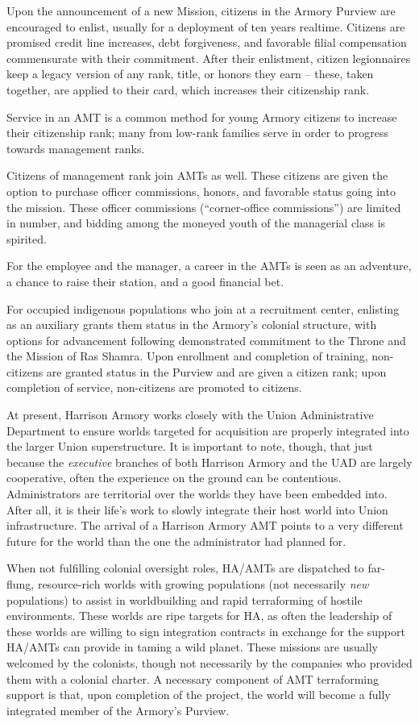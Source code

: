 Upon the announcement of a new Mission, citizens in the Armory Purview are encouraged to
enlist, usually for a deployment of ten years realtime. Citizens are promised credit line increases,
debt forgiveness, and favorable filial compensation commensurate with their commitment. After
their enlistment, citizen legionnaires keep a legacy version of any rank, title, or honors they earn
-- these, taken together, are applied to their card, which increases their citizenship rank.

Service in an AMT is a common method for young Armory citizens to increase their citizenship
rank; many from low-rank families serve in order to progress towards management ranks.

Citizens of management rank join AMTs as well. These citizens are given the option to purchase
officer commissions, honors, and favorable status going into the mission. These officer
commissions (“corner-office commissions”) are limited in number, and bidding among the
moneyed youth of the managerial class is spirited.

For the employee and the manager, a career in the AMTs is seen as an adventure, a chance to
raise their station, and a good financial bet.

For occupied indigenous populations who join at a recruitment center, enlisting as an auxiliary
grants them status in the Armory’s colonial structure, with options for advancement following
demonstrated commitment to the Throne and the Mission of Ras Shamra. Upon enrollment and
completion of training, non-citizens are granted status in the Purview and are given a citizen
rank; upon completion of service, non-citizens are promoted to citizens.

At present, Harrison Armory works closely with the Union Administrative Department to ensure
worlds targeted for acquisition are properly integrated into the larger Union superstructure. It is
important to note, though, that just because the \textit{executive} branches of both Harrison Armory and
the UAD are largely cooperative, often the experience on the ground can be contentious.
Administrators are territorial over the worlds they have been embedded into. After all, it is their
life’s work to slowly integrate their host world into Union infrastructure. The arrival of a Harrison
Armory AMT points to a very different future for the world than the one the administrator had
planned for.

When not fulfilling colonial oversight roles, HA/AMTs are dispatched to far-flung, resource-rich
worlds with growing populations (not necessarily \textit{new} populations) to assist in worldbuilding and
rapid terraforming of hostile environments. These worlds are ripe targets for HA, as often the
leadership of these worlds are willing to sign integration contracts in exchange for the support
HA/AMTs can provide in taming a wild planet. These missions are usually welcomed by the
colonists, though not necessarily by the companies who provided them with a colonial charter. A
necessary component of AMT terraforming support is that, upon completion of the project, the
world will become a fully integrated member of the Armory’s Purview.

